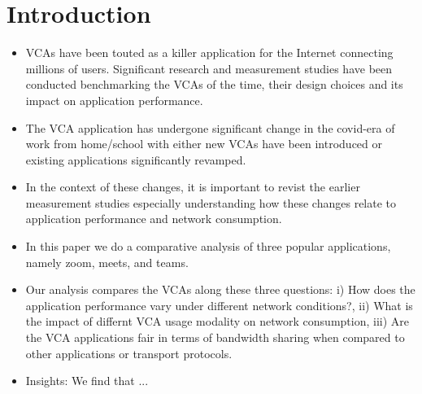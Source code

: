 \section{Introduction}\label{sec:intro}
\begin{itemize}
\item VCAs have been touted as a killer application for the Internet connecting millions of users. Significant research and measurement studies have been conducted benchmarking the VCAs of the time, their design choices and its impact on application performance. 

\item The VCA application has undergone significant change in the covid-era of work from home/school with either new VCAs have been introduced or existing applications significantly revamped.

\item In the context of these changes, it is important to revist the earlier measurement studies especially understanding how these changes relate to application performance and network consumption.

\item In this paper we do a comparative analysis of three popular applications, namely zoom, meets, and teams. 

\item Our analysis compares the VCAs along these three questions: i) How does the application performance vary under different network conditions?, ii) What is the impact of differnt VCA usage modality on network consumption, iii) Are the VCA applications fair in terms of bandwidth sharing when compared to other applications or transport protocols.

\item Insights: We find that ... 
\end{itemize}

